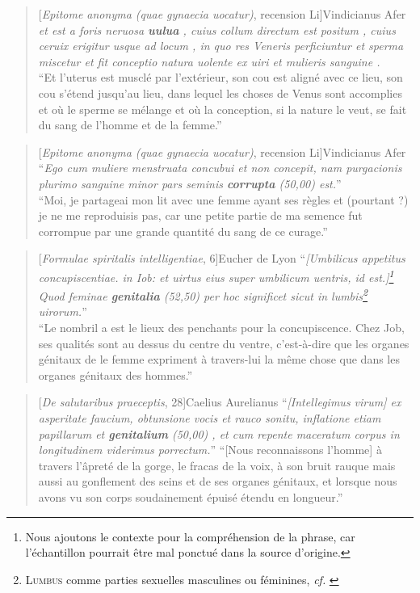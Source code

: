 \starbreak

\begin{quote}[\textit{Epitome anonyma (quae gynaecia uocatur)}, recension Li]{Vindicianus Afer}
    \textit{et est a foris neruosa \textbf{uulua} , cuius collum directum est positum , cuius ceruix erigitur usque ad locum , in quo res Veneris perficiuntur et sperma miscetur et fit conceptio natura uolente ex uiri et mulieris sanguine .} \\
    \enquote{Et l'uterus est musclé par l'extérieur, son cou est aligné avec ce lieu, son cou s'étend jusqu'au lieu, dans lequel les choses de Venus sont accomplies et où le sperme se mélange et où la conception, si la nature le veut, se fait du sang de l'homme et de la femme.}
\end{quote}

\begin{quote}[\textit{Epitome anonyma (quae gynaecia uocatur)}, recension Li]{Vindicianus Afer}
    \enquote{\textit{Ego cum muliere menstruata concubui et non concepit, nam purgacionis plurimo sanguine minor pars seminis \textbf{corrupta} (50,00) est.}} \\
    \enquote{Moi, je partageai mon lit avec une femme ayant ses règles et (pourtant ?) je ne me reproduisis pas, car une petite partie de ma semence fut corrompue par une grande quantité du sang de ce curage.}
\end{quote}

\begin{quote}[\textit{Formulae spiritalis intelligentiae}, 6]{Eucher de Lyon}
    \enquote{\textit{{[}Umbilicus appetitus concupiscentiae. in Iob: et uirtus eius super umbilicum uentris, id est.{]}\footnote{Nous ajoutons le contexte pour la compréhension de la phrase, car l'échantillon pourrait être mal ponctué dans la source d'origine.} Quod feminae \textbf{genitalia} (52,50) per hoc significet sicut in lumbis\footnote{\textsc{Lumbus} comme parties sexuelles masculines ou féminines, \textit{cf.} \textcite[p.~48]{adams}} uirorum.}} \\
    \enquote{Le nombril a est le lieux des penchants pour la concupiscence. Chez Job, ses qualités sont au dessus du centre du ventre, c'est-à-dire que les organes génitaux de le femme expriment à travers-lui la même chose que dans les organes génitaux des hommes.}
\end{quote}

\begin{quote}[\textit{De salutaribus praeceptis}, 28]{Caelius Aurelianus}
    \enquote{\textit{{[}Intellegimus virum{]} ex asperitate faucium, obtunsione vocis et rauco sonitu, inflatione etiam papillarum et \textbf{genitalium} (50,00) , et cum repente maceratum corpus in longitudinem viderimus porrectum.}}
    \enquote{{[}Nous reconnaissons l'homme{]} à travers l'âpreté de la gorge, le fracas de la voix, à son bruit rauque mais aussi au gonflement des seins et de ses organes génitaux, et lorsque nous avons vu son corps soudainement épuisé étendu en longueur.}
\end{quote}

